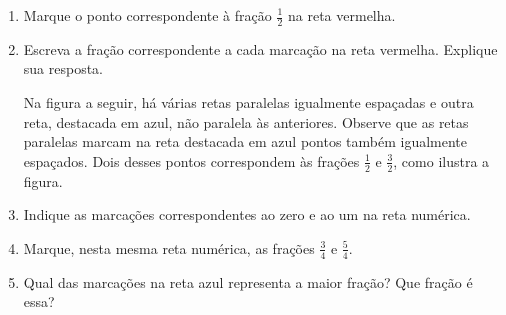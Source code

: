 \documentclass[10 pt,usenames,dvipsnames, oneside]{article}
\begin{document}
\begin{enumerate}
\item     Marque o ponto correspondente à fração $\frac{1}{2}$ na reta vermelha.
\item     Escreva a fração correspondente a cada marcação na reta vermelha. Explique sua resposta.    \mbox{} \newline

Na figura a seguir, há várias retas paralelas igualmente espaçadas e outra reta, destacada em azul, não paralela às anteriores. Observe que as retas paralelas marcam na reta destacada em azul pontos também igualmente espaçados. Dois desses pontos correspondem às frações $\frac{1}{2}$ e $\frac{3}{2}$, como ilustra a figura.

\begin{center}
\end{center}

\item    Indique as marcações correspondentes ao zero e ao um na reta numérica.
\item     Marque, nesta mesma reta numérica, as frações     $\frac{3}{4}$     e     $\frac{5}{4}$.
\item Qual das marcações na reta azul representa a maior fração? Que fração é essa?

\end{enumerate} %
\end{document}
